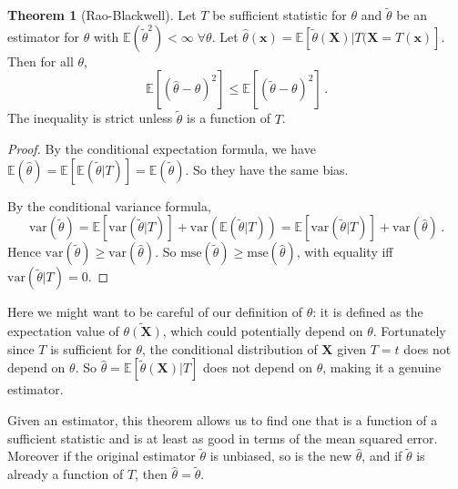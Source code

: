 \documentclass[a4paper,11pt]{article}
\theoremstyle{definition}
\newtheorem*{thm}{Theorem}
\numberwithin{equation}{section}
\begin{document}
\begin{thm}[Rao-Blackwell]
Let $T$ be sufficient statistic for $\theta$ and $\tilde{\theta}$ be an estimator for $\theta$ with $\mathbb{E}(\tilde{\theta}^2)<\infty\;\forall\theta$. Let $\hat{\theta}(\mathbf{x})=\mathbb{E}[\tilde{\theta}(\mathbf{X})|T(\mathbf{X}=T(\mathbf{x})]$. Then for all $\theta$,
\[
\mathbb{E}[(\hat{\theta}-\theta)^2]\leq\mathbb{E}[(\tilde{\theta}-\theta)^2]\,.
\]
The inequality is strict unless $\tilde{\theta}$ is a function of $T$.
\end{thm}

\begin{proof}
By the conditional expectation formula, we have $\mathbb{E}(\hat{\theta})=\mathbb{E}[\mathbb{E}(\tilde{\theta}|T)]=\mathbb{E}(\tilde{\theta})$. So they have the same bias.

By the conditional variance formula,
\[
\text{var}(\tilde{\theta})=\mathbb{E}[\text{var}(\tilde{\theta}|T)]+\text{var}(\mathbb{E}(\tilde{\theta}|T))=\mathbb{E}[\text{var}(\tilde{\theta}|T)]+\text{var}(\hat{\theta})\,.
\]
Hence $\text{var}(\tilde{\theta})\geq\text{var}(\hat{\theta})$. So $\text{mse}(\tilde{\theta})\geq\text{mse}(\hat{\theta})$, with equality iff $\text{var}(\tilde{\theta}|T)=0$.
\end{proof}

Here we might want to be careful of our definition of $\hat{\theta}$: it is defined as the expectation value of $\tilde{\theta(\mathbf{X})}$, which could potentially depend on $\theta$. Fortunately since $T$ is sufficient for $\theta$, the conditional distribution of $\mathbf{X}$ given $T=t$ does not depend on $\theta$. So $\hat{\theta}=\mathbb{E}[\tilde{\theta}(\mathbf{X})|T]$ does not depend on $\theta$, making it a genuine estimator.

Given an estimator, this theorem allows us to find one that is a function of a sufficient statistic and is at least as good in terms of the mean squared error. Moreover if the original estimator $\tilde{\theta}$ is unbiased, so is the new $\hat{\theta}$, and if $\tilde{\theta}$ is already a function of $T$, then $\hat{\theta}=\tilde{\theta}$.
\end{document}
